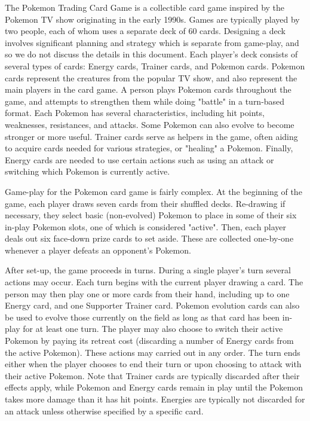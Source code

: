 \documentclass{article}
\begin{document}
The Pokemon Trading Card Game is a collectible card game inspired by the Pokemon TV show originating in the early 1990s.  Games are typically played by two people, each of whom uses a separate deck of $60$ cards.  Designing a deck involves significant planning and strategy which is separate from game-play, and so we do not discuss the details in this document.  Each player's deck consists of several types of cards: Energy cards, Trainer cards, and Pokemon cards.  Pokemon cards represent the creatures from the popular TV show, and also represent the main players in the card game.  A person plays Pokemon cards throughout the game, and attempts to strengthen them while doing "battle" in a turn-based format.  Each Pokemon has several characteristics, including hit points, weaknesses, resistances, and attacks.  Some Pokemon can also evolve to become stronger or more useful.  Trainer cards serve as helpers in the game, often aiding to acquire cards needed for various strategies, or "healing" a Pokemon.  Finally, Energy cards are needed to use certain actions such as using an attack or switching which Pokemon is currently active.

Game-play for the Pokemon card game is fairly complex.  At the beginning of the game, each player draws seven cards from their shuffled decks.  Re-drawing if necessary, they select basic (non-evolved) Pokemon to place in some of their six in-play Pokemon slots, one of which is considered "active". Then, each player deals out six face-down prize cards to set aside.  These are collected one-by-one whenever a player defeats an opponent's Pokemon.  

After set-up, the game proceeds in turns.  During a single player's turn several actions may occur.  Each turn begins with the current player drawing a card.  The person may then play one or more cards from their hand, including up to one Energy card, and one Supporter Trainer card.  Pokemon evolution cards can also be used to evolve those currently on the field as long as that card has been in-play for at least one turn.  The player may also choose to switch their active Pokemon by paying its retreat cost (discarding a number of Energy cards from the active Pokemon).  These actions may carried out in any order.  The turn ends either when the player chooses to end their turn or upon choosing to attack with their active Pokemon.  Note that Trainer cards are typically discarded after their effects apply, while Pokemon and Energy cards remain in play until the Pokemon takes more damage than it has hit points.  Energies are typically not discarded for an attack unless otherwise specified by a specific card.
\end{document}

